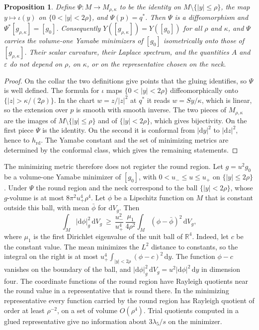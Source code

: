\documentclass[11pt]{article}
\numberwithin{equation}{section}
\newtheorem{proposition}[theorem]{Proposition}
\newcommand{\rd}{\mathrm{rd}}
\newcommand{\dd}{\mathrm{d}}
\newcommand{\e}{\varepsilon}
\newcommand{\RR}{\mathbb{R}}
\newcommand{\abs}[1]{\lvert #1\rvert}
\newcommand{\dv}{\dd V_g}
\begin{document}
\begin{proposition}\label{prop:flat-neck}
Define \(\Psi:M\to M_{\rho,\kappa}\) to be the identity on
\(M\setminus\{\abs y\le\rho\}\), the map \(y\mapsto\iota(y)\) on
\(\{0<\abs y<2\rho\}\), and \(\Psi(p)=q^*\). Then \(\Psi\) is a
diffeomorphism and \(\Psi^*[g_{\rho,\kappa}]=[g_0]\). Consequently
\(Y([g_{\rho,\kappa}])=Y([g_0])\) for all \(\rho\) and \(\kappa\), and
\(\Psi\) carries the volume-one Yamabe minimizers of \([g_0]\)
isometrically onto those of \([g_{\rho,\kappa}]\). Their scalar
curvature, their Laplace spectrum, and the quantities \(A\) and \(\e\)
do not depend on \(\rho\), on \(\kappa\), or on the representative
chosen on the neck.
\end{proposition}

\begin{proof}
On the collar the two definitions give points that the gluing
identifies, so \(\Psi\) is well defined. The formula for \(\iota\) maps
\(\{0<\abs y<2\rho\}\) diffeomorphically onto
\(\{\abs z>\kappa/(2\rho)\}\). In the chart \(w=z/\abs z^2\) at \(q^*\)
it reads \(w=Sy/\kappa\), which is linear, so the extension over \(p\)
is smooth with smooth inverse. The two pieces of \(M_{\rho,\kappa}\)
are the images of \(M\setminus\{\abs y\le\rho\}\) and of
\(\{\abs y<2\rho\}\), which gives bijectivity. On the first piece
\(\Psi\) is the identity. On the second it is conformal from
\(\abs{\dd y}^2\) to \(\abs{\dd z}^2\), hence to \(h_{\rd}\). The Yamabe
constant and the set of minimizing metrics are determined by the
conformal class, which gives the remaining statements.
\end{proof}

The minimizing metric therefore does not register the round region.
Let \(g=u^2g_0\) be a volume-one Yamabe minimizer of \([g_0]\), with
\(0<u_-\le u\le u_+\) on \(\{\abs y\le2\rho\}\). Under \(\Psi\) the
round region and the neck correspond to the ball
\(\{\abs y<2\rho\}\), whose \(g\)-volume is at most
\(8\pi^2u_+^4\rho^4\). Let \(\phi\) be a Lipschitz function on \(M\)
that is constant outside this ball, with mean \(\bar\phi\) for
\(\dv\). Then
\begin{equation}\label{eq:chamber-rayleigh}
 \int_M\abs{\dd\phi}_g^2\,\dv\ \ge\
 \frac{u_-^2}{u_+^4}\,\frac{\mu_1}{4\rho^2}
 \int_M(\phi-\bar\phi)^2\,\dv ,
\end{equation}
where \(\mu_1\) is the first Dirichlet eigenvalue of the unit ball of
\(\RR^4\). Indeed, let \(c\) be the constant value. The mean minimizes
the \(L^2\) distance to constants, so the integral on the right is at
most \(u_+^4\int_{\abs y<2\rho}(\phi-c)^2\,\dd y\). The function
\(\phi-c\) vanishes on the boundary of the ball, and
\(\abs{\dd\phi}_g^2\,\dv=u^2\abs{\dd\phi}^2\,\dd y\) in dimension four.
The coordinate functions of the round region have Rayleigh quotients
near the round value in a representative that is round there. In the
minimizing representative every function carried by the round region
has Rayleigh quotient of order at least \(\rho^{-2}\), on a set of
volume \(O(\rho^4)\). Trial quotients computed in a glued
representative give no information about \(3\lambda_5/s\) on the
minimizer.
\end{document}
